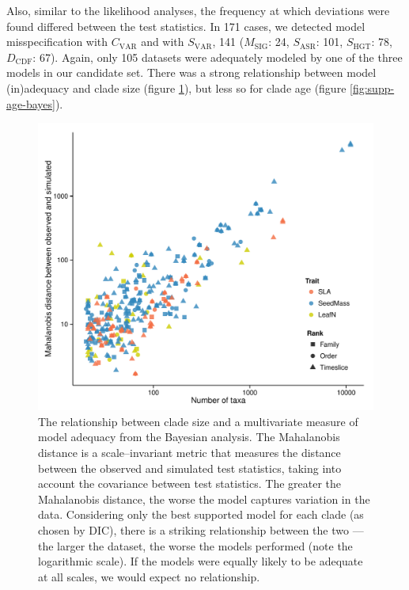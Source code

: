 Also, similar to the likelihood analyses, the frequency at which deviations were found differed between the test statistics. In 171 cases, we detected model misspecification with $C_{\text{VAR}}$ and with $S_{\text{VAR}}$, 141 ($M_{\text{SIG}}$: 24, $S_{\text{ASR}}$: 101, $S_{\text{HGT}}$: 78, $D_{\text{CDF}}$: 67). Again, only 105 datasets were adequately modeled by one of the three models in our candidate set. There was a strong relationship between model (in)adequacy and clade size (figure \ref{fig:supp-size-adequacy}), but less so for clade age (figure \ref{fig:supp-age-bayes}).

\begin{figure}[p]
  \centering
  \includegraphics[width=\textwidth]{figs/ad-size-bayes}
  \caption[Model adequacy versus clade size (Bayesian)]{The relationship between clade size and a multivariate measure of model adequacy from the Bayesian analysis. The Mahalanobis distance is a scale--invariant metric that measures the distance between the observed and simulated test statistics, taking into account the covariance between test statistics. The greater the Mahalanobis distance, the worse the model captures variation in the data. Considering only the best supported model for each clade (as chosen by DIC), there is a striking relationship between the two --- the larger the dataset, the worse the models performed (note the logarithmic scale). If the models were equally likely to be adequate at all scales, we would expect no relationship.}
  \label{fig:supp-size-adequacy}
\end{figure}


